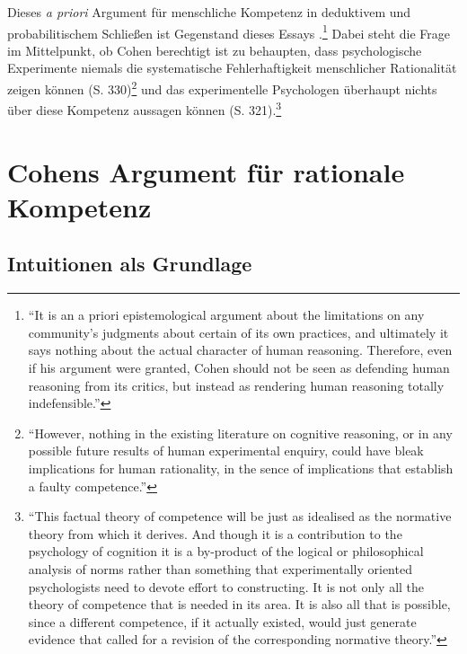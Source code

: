 \documentclass[ngerman,12pt, titlepage, smallheadings, nomath]{scrartcl}
\begin{document}
Dieses \emph{a priori} Argument für menschliche Kompetenz in deduktivem
und probabilitischem Schließen ist Gegenstand dieses Essays
\autocite[vgl.][S. 68]{shier2000}.\footnote{\enquote{It is an a priori
  epistemological argument about the limitations on any community's
  judgments about certain of its own practices, and ultimately it says
  nothing about the actual character of human reasoning. Therefore, even
  if his argument were granted, Cohen should not be seen as defending
  human reasoning from its critics, but instead as rendering human
  reasoning totally indefensible.}} Dabei steht die Frage im
Mittelpunkt, ob Cohen berechtigt ist zu behaupten, dass psychologische
Experimente niemals die systematische Fehlerhaftigkeit menschlicher
Rationalität zeigen können (S. 330)\footnote{\enquote{However, nothing
  in the existing literature on cognitive reasoning, or in any possible
  future results of human experimental enquiry, could have bleak
  implications for human rationality, in the sence of implications that
  establish a faulty competence.}} und das experimentelle Psychologen
überhaupt nichts über diese Kompetenz aussagen können (S.
321).\footnote{\enquote{This factual theory of competence will be just
  as idealised as the normative theory from which it derives. And though
  it is a contribution to the psychology of cognition it is a by-product
  of the logical or philosophical analysis of norms rather than
  something that experimentally oriented psychologists need to devote
  effort to constructing. It is not only all the theory of competence
  that is needed in its area. It is also all that is possible, since a
  different competence, if it actually existed, would just generate
  evidence that called for a revision of the corresponding normative
  theory.}}

\section{Cohens Argument für rationale
Kompetenz}\label{cohens-argument-fuxfcr-rationale-kompetenz}

\vspace{-1.25em}

\subsection{Intuitionen als Grundlage}\label{intuitionen-als-grundlage}

\vspace{-1.25em}
\end{document}
